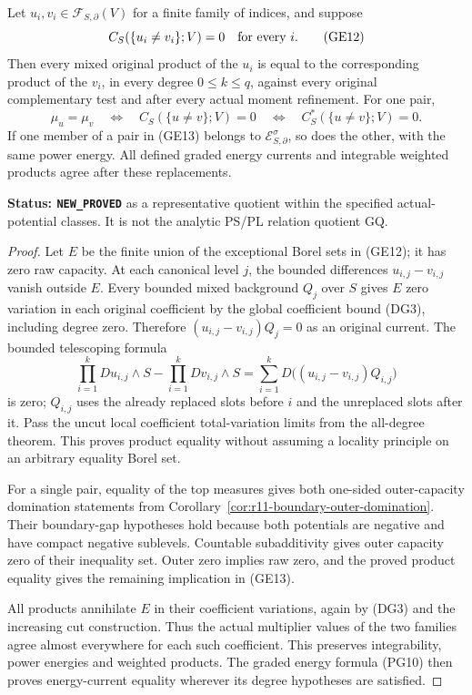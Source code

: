 \begin{proposition}
\label{prop:r11-capacity-representative-quotient}
Let $u_i,v_i\in\mathcal F_{S,\partial}(V)$ for a finite
family of indices, and suppose
\[
       C_S(\{u_i\ne v_i\};V)=0\quad\hbox{for every }i.
 \tag{GE12}
\]
Then every mixed original product of the $u_i$ is equal to
the corresponding product of the $v_i$, in every degree
$0\leq k\leq q$, against every original complementary test
and after every actual moment refinement. For one pair,
\[
 \mu_u=\mu_v
  \quad\Longleftrightarrow\quad C_S(\{u\ne v\};V)=0
  \quad\Longleftrightarrow\quad C_S^*(\{u\ne v\};V)=0.
 \tag{GE13}
\]
If one member of a pair in (GE13) belongs to
$\mathcal E^\sigma_{S,\partial}$, so does the other, with
the same power energy. All defined graded energy currents
and integrable weighted products agree after these replacements.
\end{proposition}

\noindent\textbf{Status: \texttt{NEW\_PROVED}} as a
representative quotient within the specified actual-potential
classes. It is not the analytic PS/PL relation quotient GQ.

\begin{proof}
Let $E$ be the finite union of the exceptional Borel sets in
(GE12); it has zero raw capacity. At each canonical level $j$,
the bounded differences $u_{i,j}-v_{i,j}$ vanish outside $E$.
Every bounded mixed background $Q_j$ over $S$ gives $E$ zero
variation in each original coefficient by the global
coefficient bound (DG3), including degree zero. Therefore
$(u_{i,j}-v_{i,j})Q_j=0$ as an original current. The bounded
telescoping formula
\[
 \prod_{i=1}^k Du_{i,j}\wedge S-
 \prod_{i=1}^k Dv_{i,j}\wedge S
       =\sum_{i=1}^k D\bigl((u_{i,j}-v_{i,j})Q_{i,j}\bigr)
 \tag{GE14}
\]
is zero; $Q_{i,j}$ uses the already replaced slots before
$i$ and the unreplaced slots after it. Pass the uncut local
coefficient total-variation limits from the all-degree theorem.
This proves product equality without assuming a locality
principle on an arbitrary equality Borel set.

For a single pair, equality of the top measures gives both
one-sided outer-capacity domination statements from
Corollary~\ref{cor:r11-boundary-outer-domination}. Their
boundary-gap hypotheses hold because both potentials are
negative and have compact negative sublevels. Countable
subadditivity gives outer capacity zero of their inequality
set. Outer zero implies raw zero, and the proved product
equality gives the remaining implication in (GE13).

All products annihilate $E$ in their coefficient variations,
again by (DG3) and the increasing cut construction. Thus
the actual multiplier values of the two families agree
almost everywhere for each such coefficient. This preserves
integrability, power energies and weighted products.
The graded energy formula (PG10) then proves energy-current
equality wherever its degree hypotheses are satisfied.
\end{proof}

